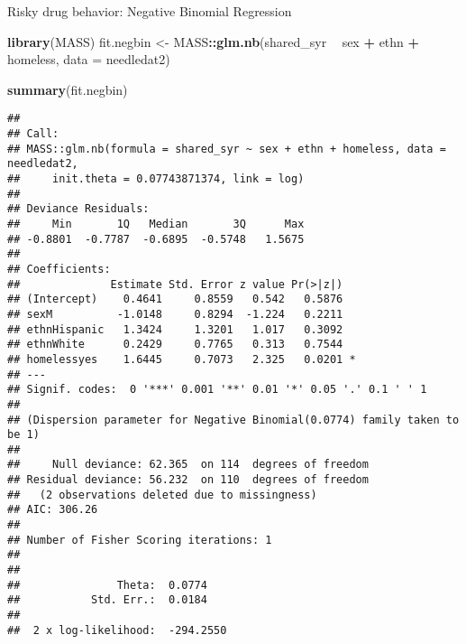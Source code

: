 \documentclass[
  ignorenonframetext,
]{beamer}
\newenvironment{Shaded}{\begin{snugshade}}{\end{snugshade}}
\newcommand{\DataTypeTok}[1]{\textcolor[rgb]{0.13,0.29,0.53}{#1}}
\newcommand{\KeywordTok}[1]{\textcolor[rgb]{0.13,0.29,0.53}{\textbf{#1}}}
\newcommand{\NormalTok}[1]{#1}
\newcommand{\OperatorTok}[1]{\textcolor[rgb]{0.81,0.36,0.00}{\textbf{#1}}}
\newcommand{\StringTok}[1]{\textcolor[rgb]{0.31,0.60,0.02}{#1}}
\begin{document}
\begin{frame}[fragile]{Risky drug behavior: Negative Binomial
Regression}
\protect\hypertarget{risky-drug-behavior-negative-binomial-regression}{}

\begin{Shaded}
\begin{Highlighting}[]
\KeywordTok{library}\NormalTok{(MASS)}
\NormalTok{fit.negbin <-}\StringTok{ }\NormalTok{MASS}\OperatorTok{::}\KeywordTok{glm.nb}\NormalTok{(shared_syr }\OperatorTok{~}\StringTok{ }\NormalTok{sex }\OperatorTok{+}
\StringTok{                             }\NormalTok{ethn }\OperatorTok{+}\StringTok{ }\NormalTok{homeless,}
                           \DataTypeTok{data =}\NormalTok{ needledat2)}
\end{Highlighting}
\end{Shaded}

\end{frame}

\begin{frame}[fragile]{}
\protect\hypertarget{section}{}

\tiny

\begin{Shaded}
\begin{Highlighting}[]
\KeywordTok{summary}\NormalTok{(fit.negbin)}
\end{Highlighting}
\end{Shaded}

\begin{verbatim}
## 
## Call:
## MASS::glm.nb(formula = shared_syr ~ sex + ethn + homeless, data = needledat2, 
##     init.theta = 0.07743871374, link = log)
## 
## Deviance Residuals: 
##     Min       1Q   Median       3Q      Max  
## -0.8801  -0.7787  -0.6895  -0.5748   1.5675  
## 
## Coefficients:
##              Estimate Std. Error z value Pr(>|z|)  
## (Intercept)    0.4641     0.8559   0.542   0.5876  
## sexM          -1.0148     0.8294  -1.224   0.2211  
## ethnHispanic   1.3424     1.3201   1.017   0.3092  
## ethnWhite      0.2429     0.7765   0.313   0.7544  
## homelessyes    1.6445     0.7073   2.325   0.0201 *
## ---
## Signif. codes:  0 '***' 0.001 '**' 0.01 '*' 0.05 '.' 0.1 ' ' 1
## 
## (Dispersion parameter for Negative Binomial(0.0774) family taken to be 1)
## 
##     Null deviance: 62.365  on 114  degrees of freedom
## Residual deviance: 56.232  on 110  degrees of freedom
##   (2 observations deleted due to missingness)
## AIC: 306.26
## 
## Number of Fisher Scoring iterations: 1
## 
## 
##               Theta:  0.0774 
##           Std. Err.:  0.0184 
## 
##  2 x log-likelihood:  -294.2550
\end{verbatim}

\end{frame}
\end{document}
